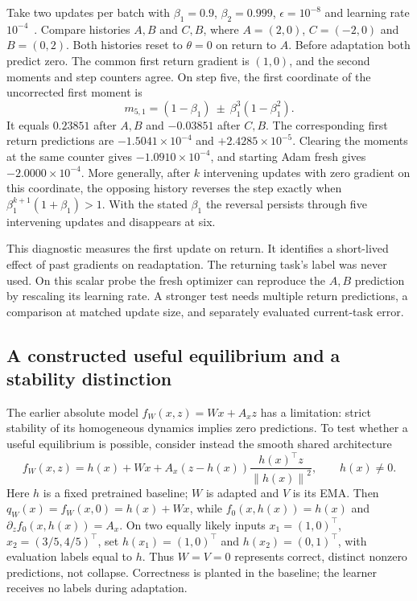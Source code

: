 \documentclass[11pt,a4paper]{article}
\newcommand{\norm}[1]{\left\lVert #1\right\rVert}
\begin{document}
Take two updates per batch with $\beta_1=0.9$, $\beta_2=0.999$,
$\epsilon=10^{-8}$ and learning rate $10^{-4}$~\cite{adam}.
Compare histories $A,B$ and $C,B$, where $A=(2,0)$, $C=(-2,0)$ and
$B=(0,2)$. Both histories reset to $\theta=0$ on return to $A$.
Before adaptation both predict zero. The common first return gradient
is $(1,0)$, and the second moments and step counters agree. On step five,
the first coordinate of the uncorrected first moment is
\[
 m_{5,1}=(1-\beta_1)\ \mathbin{\pm}\ \beta_1^3(1-\beta_1^2).
\]
It equals $0.23851$ after $A,B$ and $-0.03851$ after $C,B$.
The corresponding first return predictions are $-1.5041\times10^{-4}$
and $+2.4285\times10^{-5}$. Clearing the moments at the same counter
gives $-1.0910\times10^{-4}$, and starting Adam fresh gives
$-2.0000\times10^{-4}$. More generally, after $k$ intervening updates
with zero gradient on this coordinate, the opposing history reverses
the step exactly when $\beta_1^{k+1}(1+\beta_1)>1$. With the stated
$\beta_1$ the reversal persists through five intervening updates and
disappears at six.

This diagnostic measures the first update on return. It identifies a
short-lived effect of past gradients on readaptation. The returning
task's label was never used. On this scalar probe the fresh optimizer
can reproduce the $A,B$ prediction by rescaling its learning rate.
A stronger test needs multiple return predictions, a comparison at
matched update size, and separately evaluated current-task error.

\subsection{A constructed useful equilibrium and a stability distinction}
The earlier absolute model $f_W(x,z)=Wx+A_xz$ has a limitation: strict
stability of its homogeneous dynamics implies zero predictions. To test
whether a useful equilibrium is possible, consider instead the smooth
shared architecture
\begin{equation}
 f_W(x,z)=h(x)+Wx+
 A_x(z-h(x))\frac{h(x)^\top z}{\norm{h(x)}^2},
 \qquad h(x)\ne0.
 \label{eq:realization}
\end{equation}
Here $h$ is a fixed pretrained baseline; $W$ is adapted and $V$ is its EMA.
Then $q_W(x)=f_W(x,0)=h(x)+Wx$, while $f_0(x,h(x))=h(x)$ and
$\partial_z f_0(x,h(x))=A_x$. On two equally likely inputs
$x_1=(1,0)^\top$, $x_2=(3/5,4/5)^\top$, set
$h(x_1)=(1,0)^\top$ and $h(x_2)=(0,1)^\top$, with evaluation labels
equal to $h$. Thus $W=V=0$ represents correct, distinct nonzero
predictions, not collapse. Correctness is planted in the baseline;
the learner receives no labels during adaptation.
\end{document}
